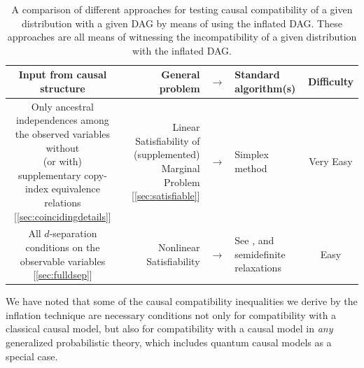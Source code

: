 {\begin{table}[ht]
\centering
\caption{A comparison of different approaches for testing causal compatibility of a given distribution with a given DAG by means of using the inflated DAG. These approaches are all means of witnessing the incompatibility of a given distribution with the inflated DAG.  
}
\begin{tabularx}{\linewidth}{ |c|RlL|c| } 
\toprule
Input from causal structure & General problem & $\to$ & Standard algorithm(s) & Difficulty \\
\midrule
\midrule
\parbox{5cm}{Only ancestral independences among the observed variables without \\(or with) supplementary copy-index equivalence relations [\cref{sec:coincidingdetails}]} & Linear Satisfiability of (supplemented) Marginal Problem [\cref{sec:satisfiable}] & $\to$ & Simplex method \cite{Korovin2012ImplementingCRA,Bobot2012SimplexSAT} & Very Easy \\
\hline
\parbox{5cm}{All $d$-separation conditions on the observable variables [\cref{sec:fulldsep}]} & Nonlinear Satisfiability & $\to$ & See \cite{BarFT-SMTLIB}, and semidefinite relaxations~\cite{laurent_polynomial_2012} & Easy \\
\bottomrule
\end{tabularx}
\label{table:satisfiabledifficulties}
\end{table}


We have noted that some of the causal compatibility inequalities we derive by the inflation technique are necessary conditions not only for compatibility with a classical causal model, but also 
for compatibility with a causal model in {\em any} generalized probabilistic theory, which includes quantum causal models as a special case.  


}
